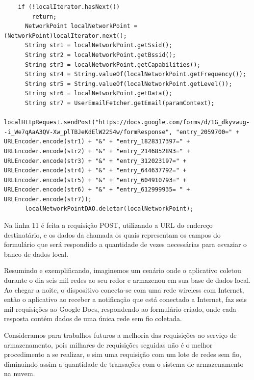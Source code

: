 \documentclass[12pt, %
openright, 
oneside,
a4paper,
brazil]{facom-ufu-abntex2}
\begin{document}
\begin{lstlisting}
	if (!localIterator.hasNext())
        return;
      NetworkPoint localNetworkPoint = (NetworkPoint)localIterator.next();
      String str1 = localNetworkPoint.getSsid();
      String str2 = localNetworkPoint.getBssid();
      String str3 = localNetworkPoint.getCapabilities();
      String str4 = String.valueOf(localNetworkPoint.getFrequency());
      String str5 = String.valueOf(localNetworkPoint.getLevel());
      String str6 = localNetworkPoint.getData();
      String str7 = UserEmailFetcher.getEmail(paramContext);
      localHttpRequest.sendPost("https://docs.google.com/forms/d/1G_dkyvwug--i_We7qAaA3QV-Xw_plTBJeKdElW22S4w/formResponse", "entry_2059700=" + URLEncoder.encode(str1) + "&" + "entry_1828317397=" + URLEncoder.encode(str2) + "&" + "entry_2146852893=" + URLEncoder.encode(str3) + "&" + "entry_312023197=" + URLEncoder.encode(str4) + "&" + "entry_644637792=" + URLEncoder.encode(str5) + "&" + "entry_604910793=" + URLEncoder.encode(str6) + "&" + "entry_612999935= " + URLEncoder.encode(str7));
      localNetworkPointDAO.deletar(localNetworkPoint);
\end{lstlisting}  

 Na linha 11 é feita a requisição POST, utilizando a URL do endereço destinatário, e os dados da chamada os quais representam os campos do formulário que será respondido a quantidade de vezes necessárias para esvaziar o banco de dados local. 
 
Resumindo e exemplificando, imaginemos um cenário onde o aplicativo coletou durante o dia seis mil redes ao seu redor e armazenou em sua base de dados local. Ao chegar a noite, o dispositivo conecta-se com uma rede wireless com Internet, então o aplicativo ao receber a notificação que está conectado a Internet, faz seis mil requisições ao Google Docs, respondendo ao formulário criado, onde cada resposta contém dados de uma única rede sem fio coletada.

Consideramos para trabalhos futuros a melhoria das requisições ao serviço de armazenamento, pois milhares de requisições seguidas não é o melhor procedimento a se realizar, e sim uma requisição com um lote de redes sem fio, diminuindo assim a quantidade de transações com o sistema de armazenamento na nuvem.
 
\end{document}
